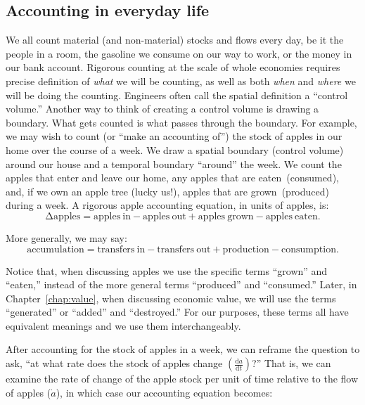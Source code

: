 \subsection{Accounting in everyday life}
\label{sec:accounting_in_everyday_life}

We all count material (and non-material) stocks and flows every day,
be it the people in a room, the gasoline we consume on our way to work,
or the money in our bank account.
Rigorous counting at the scale of whole economies 
requires precise definition of
\emph{what} we will be counting,
as well as both \emph{when} and \emph{where} 
we will be doing the counting. 
Engineers often call the spatial definition a ``control volume.'' 
Another way to think of creating a
control volume is drawing a boundary. 
What gets counted is what passes through the boundary.
For example, 
we may wish to count (or ``make an accounting of'') 
the stock of apples in our home over the course of a week. 
We draw a spatial boundary (control volume) around our house 
and a temporal boundary ``around'' the week.
We count the apples that enter and leave our home, any
apples that are eaten~(consumed),
and, if we own an apple tree (lucky us!), 
apples that are grown~(produced) during a week. 
A rigorous apple accounting equation, in units of apples, is:
\begin{equation}
	\mathrm{\Delta}\mathrm{apples} 
	= \mathrm{apples~in} 
	- \mathrm{apples~out} 
	+ \mathrm{apples~grown} 
	- \mathrm{apples~eaten}.
\end{equation}

\noindent{}More generally, we may say:
\begin{equation}
	\label{eq:general_accumulation_equation}
	\mathrm{accumulation}
	= \mathrm{transfers~in} 
	- \mathrm{transfers~out}
	+ \mathrm{production}
	- \mathrm{consumption}.
\end{equation}

Notice that, when discussing apples we use the specific terms 
``grown'' and ``eaten,'' 
instead of the more general terms 
``produced'' and ``consumed.''
Later, in Chapter~\ref{chap:value}, when discussing economic value, 
we will use the terms
``generated'' or ``added'' and ``destroyed.'' 
For our purposes, these terms all have equivalent
meanings and we use them interchangeably.

After accounting for the stock of apples in a week,
we can reframe the question to ask,
``at what rate does the stock of apples change 
$\left( \frac{\mathrm{d}a}{\mathrm{d}t} \right)$?'' 
That is, we can examine the rate of
change of the apple stock per unit of time 
relative to the flow of apples ($\dot{a}$), 
in which case our accounting equation becomes:

